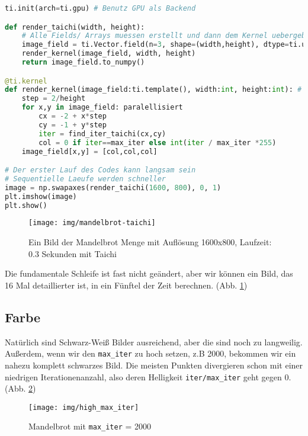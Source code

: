 \documentclass{article}
\begin{document}
\begin{lstlisting}[language=python]
ti.init(arch=ti.gpu) # Benutz GPU als Backend

def render_taichi(width, height):
	# Alle Fields/ Arrays muessen erstellt und dann dem Kernel uebergeben werden
	image_field = ti.Vector.field(n=3, shape=(width,height), dtype=ti.uint32)
	render_kernel(image_field, width, height)
	return image_field.to_numpy()

@ti.kernel
def render_kernel(image_field:ti.template(), width:int, height:int): # type:ignore
	step = 2/height
	for x,y in image_field: paralellisiert
		cx = -2 + x*step
		cy = -1 + y*step
		iter = find_iter_taichi(cx,cy)
		col = 0 if iter==max_iter else int(iter / max_iter *255)
	image_field[x,y] = [col,col,col]

# Der erster Lauf des Codes kann langsam sein
# Sequentielle Laeufe werden schneller
image = np.swapaxes(render_taichi(1600, 800), 0, 1)
plt.imshow(image)
plt.show()
\end{lstlisting}
\begin{figure}[!htb]
	\centering
	\texttt{[image: img/mandelbrot-taichi]}
	\caption{Ein Bild der Mandelbrot Menge mit Auflösung 1600x800, Laufzeit: 0.3 Sekunden mit Taichi}
	\label{fig:mandelbrot-taichi}
\end{figure}
Die fundamentale Schleife ist fast nicht geändert, aber wir können ein Bild, das 16 Mal detaillierter ist, in ein Fünftel der Zeit berechnen. (Abb. \ref{fig:mandelbrot-taichi})

\subsection{Farbe}
Natürlich sind Schwarz-Weiß Bilder ausreichend, aber die sind noch zu langweilig. Außerdem, wenn wir den \lstinline|max_iter| zu hoch setzen, z.B 2000, bekommen wir ein nahezu komplett schwarzes Bild. Die meisten Punkten divergieren schon mit einer niedrigen Iterationenanzahl, also deren Helligkeit \lstinline|iter/max_iter| geht gegen 0. (Abb. \ref{fig:highmaxiter})

\begin{figure}[!htb]
\centering
\texttt{[image: img/high\_max\_iter]}
\caption{Mandelbrot mit \lstinline|max_iter| = 2000}
\label{fig:highmaxiter}
\end{figure}
\end{document}
